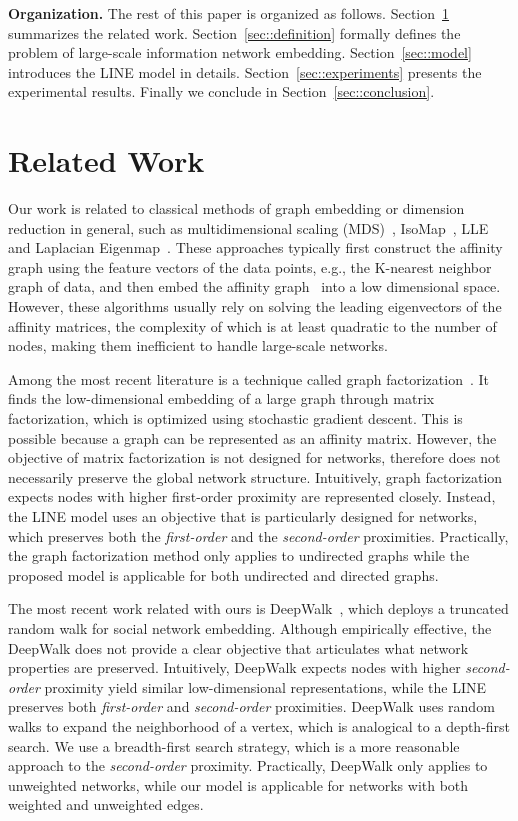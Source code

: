\documentclass{sig-alternate-2013}
\begin{document}
\textbf{Organization.} The rest of this paper is organized as follows. Section~\ref{sec::related} summarizes the related work. Section~\ref{sec::definition} formally defines the problem of large-scale information network embedding. Section~\ref{sec::model} introduces the LINE model in details. Section~\ref{sec::experiments} presents the experimental results. Finally we conclude in Section~\ref{sec::conclusion}.

\section{Related Work} 
\label{sec::related}

Our work is related to classical methods of graph embedding or dimension reduction in general, such as multidimensional scaling (MDS)~\cite{cox2000multidimensional}, IsoMap~\cite{tenenbaum2000global}, LLE~\cite{roweis2000nonlinear} and Laplacian Eigenmap~\cite{belkin2001laplacian}. These approaches typically first construct the affinity graph using the feature vectors of the data points, e.g., the K-nearest neighbor graph of data,  and then embed the affinity graph~\cite{yan2007graph} into a low dimensional space. However, these algorithms usually rely on solving the leading eigenvectors of the affinity matrices, the complexity of which is at least quadratic to the number of nodes, making them inefficient to handle large-scale networks.

Among the most recent literature is a technique called graph factorization~\cite{ahmed2013distributed}. It finds the low-dimensional embedding of a large graph through matrix factorization, which is optimized using stochastic gradient descent. This is possible because a graph can be represented as an affinity matrix. However, the objective of matrix factorization is not designed for networks, therefore does not necessarily preserve the global network structure. Intuitively, graph factorization expects nodes with higher first-order proximity are represented closely. Instead, the LINE model uses an objective that is particularly designed for networks, which preserves both the \emph{first-order} and the \textit{second-order} proximities. Practically, the graph factorization method only applies to undirected graphs while the proposed model is applicable for both undirected and directed graphs.


The most recent work related with ours is DeepWalk~\cite{perozzi2014deepwalk}, which deploys a truncated random walk for social network embedding. Although empirically effective, the DeepWalk does not provide a clear objective that articulates what network properties are preserved. Intuitively, DeepWalk expects nodes with higher \emph{second-order} proximity yield similar low-dimensional representations, while the LINE preserves both \emph{first-order} and \emph{second-order} proximities. DeepWalk uses random walks to expand the neighborhood of a vertex, which is analogical to a depth-first search. We use a breadth-first search strategy, which is a more reasonable approach to the \emph{second-order} proximity. Practically, DeepWalk only applies to unweighted networks, while our model is applicable for networks with both weighted and unweighted edges. 
\end{document}

